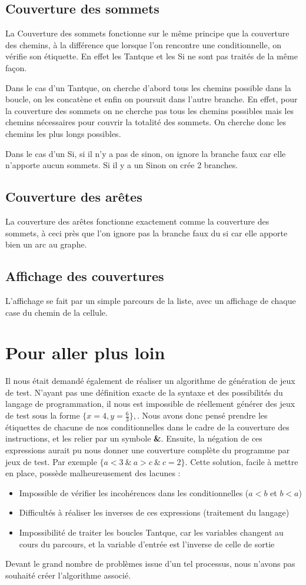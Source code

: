 \documentclass[a4paper,11pt]{article}
\begin{document}
		\subsection{Couverture des sommets}
			La Couverture des sommets fonctionne sur le même principe que la couverture des chemins, à la différence que lorsque l'on rencontre une conditionnelle, on vérifie son étiquette. En effet les Tantque et les Si ne sont pas traités de la même façon.

			Dans le cas d'un Tantque, on cherche d'abord tous les chemins possible dans la boucle, on les concatène et enfin on poursuit dans l'autre branche. En effet, pour la couverture des sommets on ne cherche pas tous les chemins possibles mais les chemins nécessaires pour couvrir la totalité des sommets. On cherche donc les chemins les plus longs possibles.

			Dans le cas d'un Si, si il n'y a pas de sinon, on ignore la branche faux car elle n'apporte aucun sommets. Si il y a un Sinon on crée 2 branches.
		\subsection{Couverture des arêtes}
			La couverture des arêtes fonctionne exactement comme la couverture des sommets, à ceci près que l'on ignore pas la branche faux du si car elle apporte bien un arc au graphe.
		\subsection{Affichage des couvertures}
			L'affichage se fait par un simple parcours de la liste, avec un affichage de chaque case du chemin de la cellule.
	\section{Pour aller plus loin}
	Il nous était demandé également de réaliser un algorithme de génération de jeux de test. N'ayant pas une définition exacte de la syntaxe et des possibilités du langage de programmation, il nous est impossible de réellement générer des jeux de test sous la forme $\{x=4,y=\frac{6}{3}\}, $. Nous avons donc pensé prendre les étiquettes de chacune de nos conditionnelles dans le cadre de la couverture des instructions, et les relier par un symbole \textbf{\&}. Ensuite, la négation de ces expressions aurait pu nous donner une couverture complète du programme par jeux de test. Par exemple $\{a<3\ \&\ a>c\ \&\ c=2\}$. Cette solution, facile à mettre en place, possède malheureusement des lacunes :
	\begin{itemize}
	\item Impossible de vérifier les incohérences dans les conditionnelles ($a<b$ et $b<a$)
	\item Difficultés à réaliser les inverses de ces expressions (traitement du langage)
	\item Impossibilité de traiter les boucles Tantque, car les variables changent au cours du parcours, et la variable d'entrée est l'inverse de celle de sortie
	\end{itemize}
	Devant le grand nombre de problèmes issue d'un tel processus, nous n'avons pas souhaité créer l'algorithme associé.
	
\end{document}
